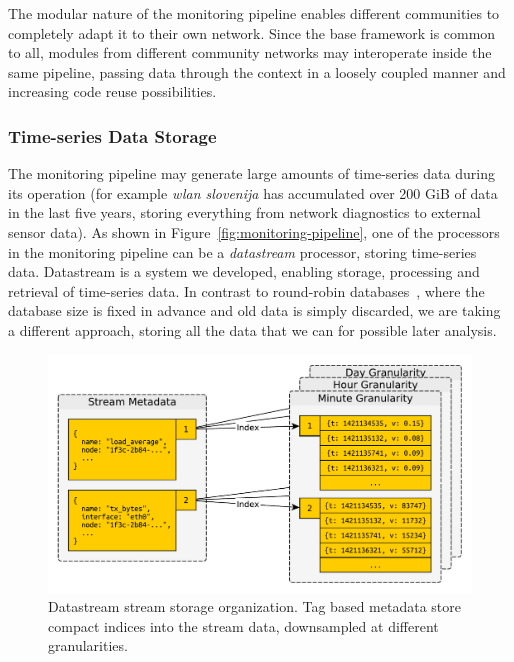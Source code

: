 \documentclass[5p,sort&compress]{elsarticle}
\newcommand{\wlanslovenija}{\textit{wlan slovenija}}
\begin{document}
The modular nature of the monitoring pipeline enables different communities to completely adapt it to their own network.
Since the base framework is common to all, modules from different community networks may interoperate inside the same pipeline, passing data through the context in a loosely coupled manner and increasing code reuse possibilities.

\subsubsection{Time-series Data Storage}

The monitoring pipeline may generate large amounts of time-series data during its operation (for example \wlanslovenija{} has accumulated over 200 GiB of data in the last five years, storing everything from network diagnostics to external sensor data).
As shown in Figure~\ref{fig:monitoring-pipeline}, one of the processors in the monitoring pipeline can be a \textit{datastream} processor, storing time-series data.
Datastream is a system we developed, enabling storage, processing and retrieval of time-series data.
In contrast to round-robin databases~\cite{Oetiker_1999}, where the database size is fixed in advance and old data is simply discarded, we are taking a different approach, storing all the data that we can for possible later analysis.

\begin{figure}
  \centering
  \includegraphics[scale=0.4]{figures/datastream-storage.pdf}
  \caption{Datastream stream storage organization. Tag based metadata store compact indices into the stream data, downsampled at different granularities.}
  \label{fig:datastream-storage}
\end{figure}
\end{document}
